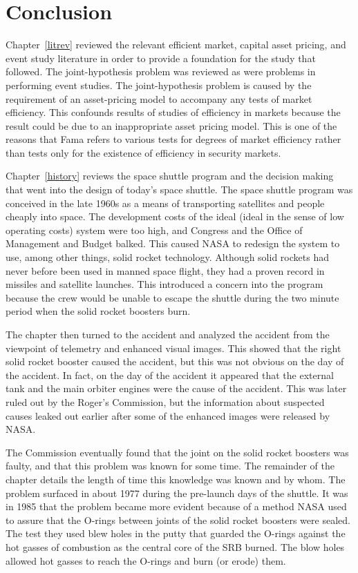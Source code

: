 \chapter{Conclusion}

Chapter~\ref{litrev} reviewed the relevant efficient market, capital asset pricing, and event study literature in order to provide a foundation for the study that followed. The joint-hypothesis problem was reviewed as were problems in performing event studies. The joint-hypothesis problem is caused by the requirement of an asset-pricing model to accompany any tests of market efficiency. This confounds results of studies of efficiency in markets because the result could be due to an inappropriate asset pricing model. This is one of the reasons that Fama refers to various tests for degrees of market efficiency rather than tests only for the existence of efficiency in security markets.

Chapter~\ref{history} reviews the space shuttle program and the decision making that went into the design of today's space shuttle. The space shuttle program was conceived in the late 1960s as a means of transporting satellites and people cheaply into space. The development costs of the ideal (ideal in the sense of low operating costs) system were too high, and Congress and the Office of Management and Budget balked. This caused NASA to redesign the system to use, among other things, solid rocket technology. Although solid rockets had never before been used in manned space flight, they had a proven record in missiles and satellite launches. This introduced a concern into the program because the crew would be unable to escape the shuttle during the two minute period when the solid rocket boosters burn.

The chapter then turned to the accident and analyzed the accident from the viewpoint of telemetry and enhanced visual images. This showed that the right solid rocket booster caused the accident, but this was not obvious on the day of the accident. In fact, on the day of the accident it appeared that the external tank and the main orbiter engines were the cause of the accident. This was later ruled out by the Roger's Commission, but the information about suspected causes leaked out earlier after some of the enhanced images were released by NASA.

The Commission eventually found that the joint on the solid rocket boosters was faulty, and that this problem was known for some time. The remainder of the chapter details the length of time this knowledge was known and by whom. The problem surfaced in about 1977 during the pre-launch days of the shuttle. It was in 1985 that the problem became more evident because of a method NASA used to assure that the O-rings between joints of the solid rocket boosters were sealed. The test they used blew holes in the putty that guarded the O-rings against the hot gasses of combustion as the central core of the SRB burned. The blow holes allowed hot gasses to reach the O-rings and burn (or erode) them.

